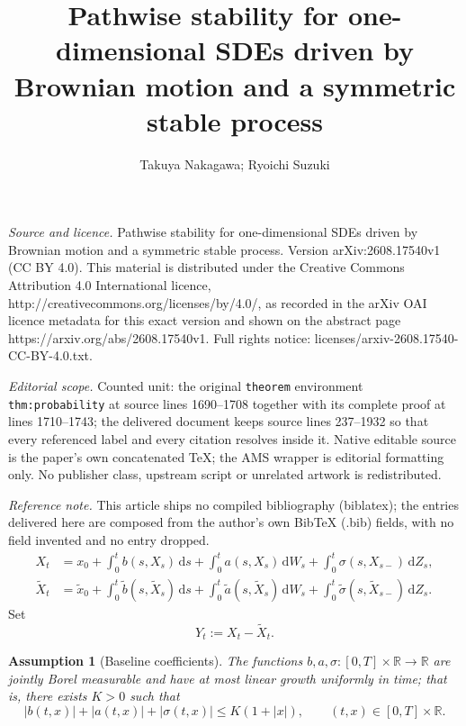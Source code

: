 \documentclass[10pt,a4paper]{amsart}
\newtheorem{assumption}[theorem]{Assumption}
\newcommand{\R}{\mathbb{R}}
\newcommand{\1}{\mathbf{1}}
\newcommand{\dd}{\,\mathrm{d}}
\newcommand{\wt}{\tilde}
\begin{document}
\title[Pathwise stability for one-dimensional SDEs driven by Browni]{Pathwise stability for one-dimensional SDEs driven by Brownian motion and a symmetric stable process}
\author{Takuya Nakagawa; Ryoichi Suzuki}
\date{}
\maketitle
\noindent\emph{Source and licence.} Pathwise stability for one-dimensional SDEs driven by Brownian motion and a symmetric stable process. Version arXiv:2608.17540v1 (CC BY 4.0). This material is distributed under the Creative Commons Attribution 4.0 International licence, http://creativecommons.org/licenses/by/4.0/, as recorded in the arXiv OAI licence metadata for this exact version and shown on the abstract page https://arxiv.org/abs/2608.17540v1. Full rights notice: licenses/arxiv-2608.17540-CC-BY-4.0.txt.\par\smallskip
\noindent\textit{Editorial scope.} Counted unit: the original \texttt{theorem} environment \texttt{thm:probability} at source lines 1690--1708 together with its complete proof at lines 1710--1743; the delivered document keeps source lines 237--1932 so that every referenced label and every citation resolves inside it. Native editable source is the paper's own concatenated TeX; the AMS wrapper is editorial formatting only. No publisher class, upstream script or unrelated artwork is redistributed.
\par\smallskip\noindent\textit{Reference note.} This article ships no compiled bibliography (biblatex); the entries delivered here are composed from the author's own BibTeX (.bib) fields, with no field invented and no entry dropped.
\begin{align}
X_t
&=x_0+\int_0^t b(s,X_s)\dd s+\int_0^t a(s,X_s)\dd W_s
 +\int_0^t \sigma(s,X_{s-})\dd Z_s, \label{eq:X}\\
\wt X_t
&=\wt x_0+\int_0^t \wt b(s,\wt X_s)\dd s+\int_0^t \wt a(s,\wt X_s)\dd W_s
 +\int_0^t \wt\sigma(s,\wt X_{s-})\dd Z_s. \label{eq:Xtilde}
\end{align}
Set
\[
  Y_t:=X_t-\wt X_t.
\]

\begin{assumption}[Baseline coefficients]\label{ass:baseline}
The functions $b,a,\sigma:[0,T]\times\R\to\R$ are jointly Borel measurable and have at most linear growth uniformly in time; that is, there exists $K>0$ such that
\[
  |b(t,x)|+|a(t,x)|+|\sigma(t,x)|\le K(1+|x|),
  \qquad (t,x)\in[0,T]\times\R.
\]
\end{assumption}
\end{document}
